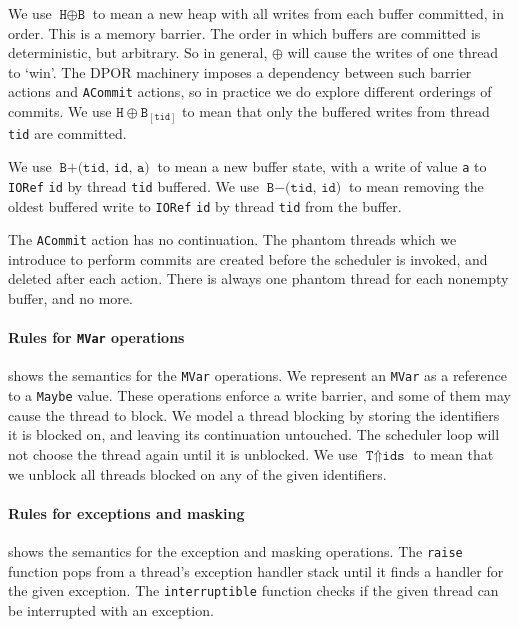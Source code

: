 We use $\texttt{H} \oplus \texttt{B}$ to mean a new heap with all
writes from each buffer committed, in order.  This is a memory
barrier.  The order in which buffers are committed is deterministic,
but arbitrary.  So in general, $\oplus$ will cause the writes of one
thread to `win'.  The DPOR machinery imposes a dependency between such
barrier actions and \verb|ACommit| actions, so in practice we do
explore different orderings of commits.  We use
$\texttt{H} \oplus \texttt{B}_{[\texttt{tid}]}$ to mean that only the
buffered writes from thread \verb|tid| are committed.

We use $\texttt{B} + \texttt{(tid, id, a)}$ to mean a new buffer
state, with a write of value \verb|a| to \verb|IORef| \verb|id| by
thread \verb|tid| buffered.  We use $\texttt{B} - \texttt{(tid, id)}$
to mean removing the oldest buffered write to \verb|IORef| \verb|id| by
thread \verb|tid| from the buffer.

The \verb|ACommit| action has no continuation.  The phantom threads
which we introduce to perform commits are created before the scheduler
is invoked, and deleted after each action.  There is always one
phantom thread for each nonempty buffer, and no more.

\paragraph{Rules for \texttt{MVar} operations}
 shows the semantics for the \verb|MVar|
operations.  We represent an \verb|MVar| as a reference to a
\verb|Maybe| value.  These operations enforce a write barrier, and
some of them may cause the thread to block.  We model a thread
blocking by storing the identifiers it is blocked on, and leaving its
continuation untouched.  The scheduler loop will not choose the thread
again until it is unblocked.  We use
$\texttt{T} \Uparrow \texttt{ids}$ to mean that we unblock all threads
blocked on any of the given identifiers.

\paragraph{Rules for exceptions and masking}
 shows the semantics for the exception and masking
operations.  The \verb|raise| function pops from a thread's exception
handler stack until it finds a handler for the given exception.  The
\verb|interruptible| function checks if the given thread can be
interrupted with an exception.


